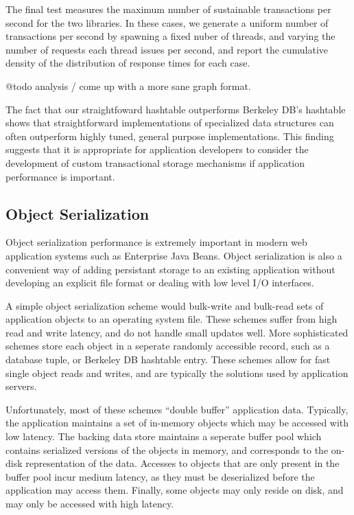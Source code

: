 \documentclass[letterpaper,twocolumn,english]{article}
\begin{document}
The final test measures the maximum number of sustainable transactions
per second for the two libraries.  In these cases, we generate a
uniform number of transactions per second by spawning a fixed nuber of
threads, and varying the number of requests each thread issues per
second, and report the cumulative density of the distribution of
response times for each case.

@todo analysis / come up with a more sane graph format.

The fact that our straightfoward hashtable outperforms Berkeley DB's hashtable shows that
straightforward implementations of specialized data structures can 
often outperform highly tuned, general purpose implementations.
This finding suggests that it is appropriate for
application developers to consider the development of custom
transactional storage mechanisms if application performance is
important.


\subsection{Object Serialization}\label{OASYS}

Object serialization performance is extremely important in modern web
application systems such as Enterprise Java Beans.  Object serialization is also a
convenient way of adding persistant storage to an existing application
without developing an explicit file format or dealing with low level
I/O interfaces.

A simple object serialization scheme would bulk-write and bulk-read
sets of application objects to an operating system file.  These
schemes suffer from high read and write latency, and do not handle
small updates well.  More sophisticated schemes store each object in a
seperate randomly accessible record, such as a database tuple, or
Berkeley DB hashtable entry.  These schemes allow for fast single
object reads and writes, and are typically the solutions used by
application servers.

Unfortunately, most of these schemes ``double buffer'' application
data.  Typically, the application maintains a set of in-memory objects
which may be accessed with low latency.  The backing data store
maintains a seperate buffer pool which contains serialized versions of
the objects in memory, and corresponds to the on-disk representation
of the data.  Accesses to objects that are only present in the buffer
pool incur medium latency, as they must be deserialized before the
application may access them.  Finally, some objects may only reside on
disk, and may only be accessed with high latency.
\end{document}
